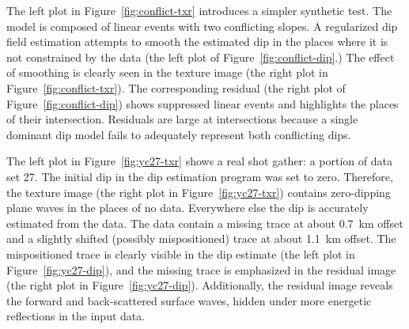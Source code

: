 \par
The left plot in Figure~\ref{fig:conflict-txr} introduces a simpler
synthetic test. The model is composed of linear events with two
conflicting slopes. A regularized dip field estimation attempts to
smooth the estimated dip in the places where it is not constrained by
the data (the left plot of Figure~\ref{fig:conflict-dip}.) The effect
of smoothing is clearly seen in the texture image (the right plot in
Figure~\ref{fig:conflict-txr}). The corresponding residual (the right
plot of Figure~\ref{fig:conflict-dip}) shows suppressed linear events
and highlights the places of their intersection. Residuals are large at 
intersections because a single dominant dip model fails to adequately
represent both conflicting dips.


\par
The left plot in Figure~\ref{fig:yc27-txr} shows a real shot gather:
a portion of \cite{yilmaz} data set 27. The initial dip in the dip
estimation program was set to zero. Therefore, the texture image (the
right plot in Figure~\ref{fig:yc27-txr}) contains zero-dipping plane
waves in the places of no data. Everywhere else the dip is accurately
estimated from the data. The data contain a missing trace at about
0.7~km offset and a slightly shifted (possibly mispositioned) trace at
about 1.1~km offset. The mispositioned trace is clearly visible in the
dip estimate (the left plot in Figure~\ref{fig:yc27-dip}), and the
missing trace is emphasized in the residual image (the right plot in
Figure~\ref{fig:yc27-dip}). Additionally, the residual image reveals
the forward and back-scattered surface waves, hidden under more
energetic reflections in the input data.

